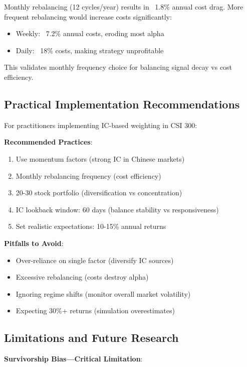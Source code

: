 Monthly rebalancing (12 cycles/year) results in ~1.8\% annual cost drag. More frequent rebalancing would increase costs significantly:
\begin{itemize}
    \item Weekly: ~7.2\% annual costs, eroding most alpha
    \item Daily: ~18\% costs, making strategy unprofitable
\end{itemize}

This validates monthly frequency choice for balancing signal decay vs cost efficiency.

\subsection{Practical Implementation Recommendations}

For practitioners implementing IC-based weighting in CSI 300:

\textbf{Recommended Practices}:
\begin{enumerate}
    \item Use momentum factors (strong IC in Chinese markets)
    \item Monthly rebalancing frequency (cost efficiency)
    \item 20-30 stock portfolio (diversification vs concentration)
    \item IC lookback window: 60 days (balance stability vs responsiveness)
    \item Set realistic expectations: 10-15\% annual returns
\end{enumerate}

\textbf{Pitfalls to Avoid}:
\begin{itemize}
    \item Over-reliance on single factor (diversify IC sources)
    \item Excessive rebalancing (costs destroy alpha)
    \item Ignoring regime shifts (monitor overall market volatility)
    \item Expecting 30\%+ returns (simulation overestimates)
\end{itemize}

\subsection{Limitations and Future Research}

\textbf{Survivorship Bias---Critical Limitation}:


